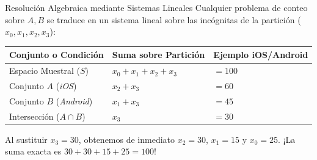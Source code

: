\begin{frame}{Resolución Algebraica mediante Sistemas Lineales}
  Cualquier problema de conteo sobre $A, B$ se traduce en un sistema lineal sobre las incógnitas de la partición ($x_0, x_1, x_2, x_3$):
  
  \vspace{0.3em}
  \begin{center}
    \begin{tabular}{l l l}
      \textbf{Conjunto o Condición} & \textbf{Suma sobre Partición} & \textbf{Ejemplo iOS/Android} \\
      \hline
      Espacio Muestral ($S$) & $x_0 + x_1 + x_2 + x_3$ & $= 100$ \\
      Conjunto $A$ (\emph{iOS}) & $x_2 + x_3$ & $= 60$ \\
      Conjunto $B$ (\emph{Android}) & $x_1 + x_3$ & $= 45$ \\
      Intersección ($A \cap B$) & $x_3$ & $= 30$ \\
      \hline
    \end{tabular}
  \end{center}
  
  \vspace{0.3em}
  \pause
  Al sustituir $x_3 = 30$, obtenemos de inmediato $x_2 = 30$, $x_1 = 15$ y $x_0 = 25$. ¡La suma exacta es $30 + 30 + 15 + 25 = 100$!
\end{frame}


